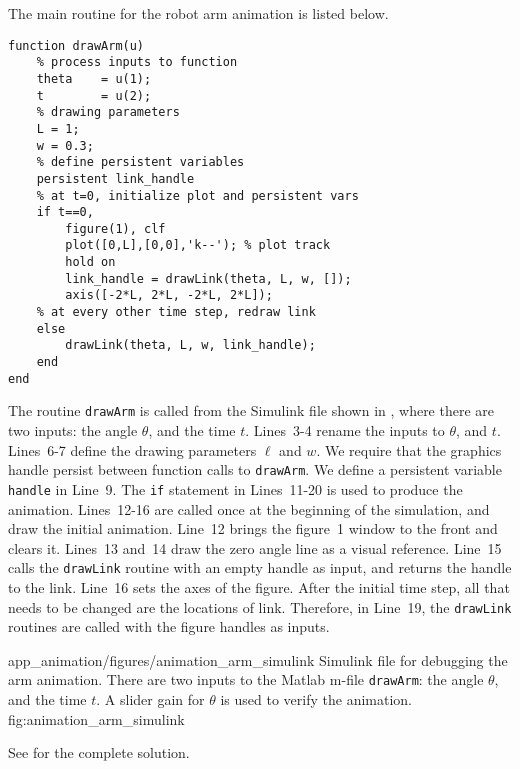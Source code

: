The main routine for the robot arm animation is listed below.
\begin{lstlisting}
function drawArm(u)
    % process inputs to function
    theta    = u(1);
    t        = u(2);
    % drawing parameters
    L = 1;
    w = 0.3;
    % define persistent variables 
    persistent link_handle   
    % at t=0, initialize plot and persistent vars
    if t==0,
        figure(1), clf
        plot([0,L],[0,0],'k--'); % plot track
        hold on
        link_handle = drawLink(theta, L, w, []);
        axis([-2*L, 2*L, -2*L, 2*L]);
    % at every other time step, redraw link
    else 
        drawLink(theta, L, w, link_handle);
    end
end
\end{lstlisting}
The routine {\tt drawArm} is called from the Simulink file shown in , where there are two inputs: the  angle $\theta$, and the time $t$.  Lines~3-4 rename the inputs to $\theta$, and $t$.  Lines~6-7 define the drawing parameters $\ell$ and $w$.  We require that the graphics handle persist between function calls to {\tt drawArm}.  We define a persistent variable {\tt handle} in Line~9.  The {\tt if} statement in Lines~11-20 is used to produce the animation.  Lines~12-16 are called once at the beginning of the simulation, and draw the initial animation.  Line~12 brings the figure~1 window to the front and clears it.  Lines~13 and~14 draw the zero angle line as a visual reference.  Line~15 calls the {\tt drawLink} routine with an empty handle as input, and returns the handle to the link.   Line~16 sets the axes of the figure.  After the initial time step, all that needs to be changed are the locations of link.  Therefore, in Line~19, the {\tt drawLink} routines are called with the figure handles as inputs.

	{app_animation/figures/animation_arm_simulink}
	{Simulink file for debugging the arm animation.  There are two inputs to the Matlab m-file {\tt drawArm}: the angle $\theta$, and the time $t$.  A slider gain for $\theta$ is used to verify the animation.}
	{fig:animation_arm_simulink}

See  for the complete solution.
